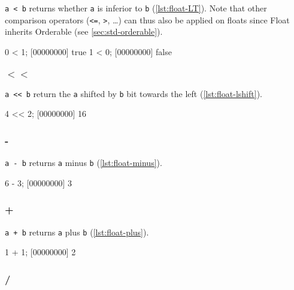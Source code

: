 \lstinline|a < b| returns whether \lstinline|a| is inferior to
\lstinline|b| (\autoref{lst:float-LT}). Note that other comparison operators
(\lstinline|<=|, \lstinline|>|, \ldots) can thus also be applied on
floats since Float inherits Orderable (see \autoref{sec:std-orderable}).

\begin{urbiscript}[caption=Float.'$<$', label=lst:float-LT,
  float=\floatposh]
0 < 1;
[00000000] true
1 < 0;
[00000000] false
\end{urbiscript}

\subsubsection{$<<$}

\lstinline|a << b| return the \lstinline|a| shifted by \lstinline|b|
bit towards the left (\autoref{lst:float-lshift}).

\begin{urbiscript}[caption=Float.'$<<$', label=lst:float-lshift,
  float=\floatposh]
4 << 2;
[00000000] 16
\end{urbiscript}

\subsubsection{-}

\lstinline|a - b| returns \lstinline|a| minus \lstinline|b| (\autoref{lst:float-minus}).

\begin{urbiscript}[caption=Float.'-', label=lst:float-minus,
  float=\floatposh]
6 - 3;
[00000000] 3
\end{urbiscript}

\subsubsection{+}

\lstinline|a + b| returns \lstinline|a| plus \lstinline|b| (\autoref{lst:float-plus}).

\begin{urbiscript}[caption=Float.'+', label=lst:float-plus, float=\floatposh]
1 + 1;
[00000000] 2
\end{urbiscript}

\subsubsection{/}

